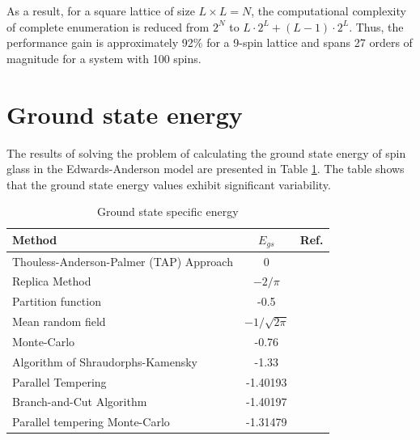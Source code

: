 \documentclass[utf8, babel, sor, jor, amsmath, amssymb, reprint]{elsarticle} %
\begin{document}
As a result, for a square lattice of size $L \times L = N$, the computational complexity of complete enumeration is reduced from $2^{N}$ to $L \cdot 2^L + (L - 1) \cdot 2^L$. Thus, the performance gain is approximately 92\% for a 9-spin lattice and spans 27 orders of magnitude for a system with 100 spins.


\section{Ground state energy}

The results of solving the problem of calculating the ground state energy of spin glass in the Edwards-Anderson model are presented in Table \ref{tab:Egs}. The table shows that the ground state energy values exhibit significant variability.

\begin{table}[h]
	\begin{tabular}{|l|c|l|}
		\hline
		Method                                   & $E_{gs}$                                       & Ref.                                          \\ \hline
		Thouless-Anderson-Palmer (TAP) Approach & 0                                              & \cite{thouless1977solution}    \\ \hline
		Replica Method                            & $-2/\pi$                                       & \cite{sherrington1975solvable} \\ \hline
		Partition function                      & -0.5                                           & \cite{tanaka1980analytic}      \\ \hline
		Mean random field                       & $-1/\sqrt{2\pi}$                               & \cite{klein1976comparison}     \\ \hline
		Monte-Carlo                             & -0.76                                          & \cite{kirkpatrick1978infinite} \\ \hline
		Algorithm of Shraudorphs-Kamensky        & -1.33                                          & \cite{karandashev2019global}   \\ \hline
		Parallel Tempering   & -1.40193                                       & \cite{palmer1999ground}        \\ \hline
		Branch-and-Cut Algorithm              & -1.40197                         
		& \cite{campbell2004energy}      \\ \hline
		
		Parallel tempering Monte-Carlo  & -1.31479                                       & \cite{roma2009ground}          \\ \hline
		
		
		
	\end{tabular}
	\caption{Ground state specific energy}
	\label{tab:Egs}
\end{table}
\end{document}
